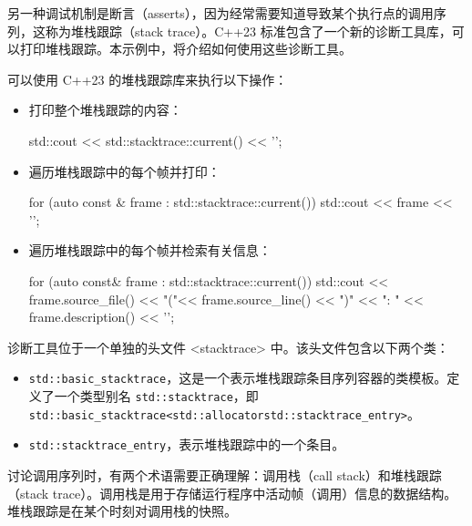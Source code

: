 
另一种调试机制是断言（asserts），因为经常需要知道导致某个执行点的调用序列，这称为堆栈跟踪（stack trace）。C++23 标准包含了一个新的诊断工具库，可以打印堆栈跟踪。本示例中，将介绍如何使用这些诊断工具。


可以使用 C++23 的堆栈跟踪库来执行以下操作：

\begin{itemize}
\item
打印整个堆栈跟踪的内容：

\begin{cpp}
std::cout << std::stacktrace::current() << '\n';
\end{cpp}

\item
遍历堆栈跟踪中的每个帧并打印：

\begin{cpp}
for (auto const & frame : std::stacktrace::current())
{
    std::cout << frame << '\n';
}
\end{cpp}

\item
遍历堆栈跟踪中的每个帧并检索有关信息：

\begin{cpp}
for (auto const& frame : std::stacktrace::current())
{
    std::cout << frame.source_file()
              << "("<< frame.source_line() << ")"
              << ": " << frame.description()
              << '\n';
}
\end{cpp}
\end{itemize}


诊断工具位于一个单独的头文件 <stacktrace> 中。该头文件包含以下两个类：

\begin{itemize}
\item
\verb|std::basic_stacktrace|，这是一个表示堆栈跟踪条目序列容器的类模板。定义了一个类型别名 \verb|std::stacktrace|，即 \verb|std::basic_stacktrace<std::allocatorstd::stacktrace_entry>|。

\item
\verb|std::stacktrace_entry|，表示堆栈跟踪中的一个条目。
\end{itemize}

\begin{myTip}
讨论调用序列时，有两个术语需要正确理解：调用栈（call stack）和堆栈跟踪（stack trace）。调用栈是用于存储运行程序中活动帧（调用）信息的数据结构。堆栈跟踪是在某个时刻对调用栈的快照。
\end{myTip}

